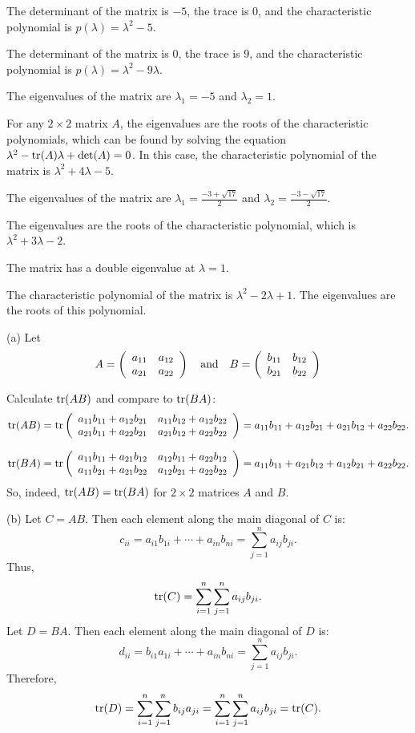 \documentclass{ximera}
\begin{document}
 The determinant of the matrix is $-5$, the trace is $0$, and
the characteristic polynomial is $p(\lambda)=\lambda^2-5$.

 The determinant of the matrix is $0$, the trace is $9$, and
the characteristic polynomial is $p(\lambda)=\lambda^2-9\lambda$.

 \ans The eigenvalues of the matrix are $\lambda_1 = -5$ and
$\lambda_2 = 1$.

\soln For any $2 \times 2$ matrix $A$, the eigenvalues are the roots
of the characteristic polynomials, which can be found by solving the
equation $\lambda^2 - {\rm tr}(A)\lambda + \det(A) = 0$.  In this case, the
characteristic polynomial of the matrix is $\lambda^2 + 4\lambda - 5$.

 \ans The eigenvalues of the matrix are
$\lambda_1 = \frac{-3 + \sqrt{17}}{2}$ and $\lambda_2 =
\frac{-3 - \sqrt{17}}{2}$.

\soln The eigenvalues are the roots of the characteristic polynomial, which
is $\lambda^2 + 3\lambda - 2$.

 \ans The matrix has a double eigenvalue at $\lambda = 1$.

\soln The characteristic polynomial of the matrix is $\lambda^2 - 2\lambda
+ 1$.  The eigenvalues are the roots of this polynomial.

(a) Let
\[
A = \left(\begin{array}{rr} a_{11} & a_{12}\\ a_{21} &a_{22}\end{array}\right) \quad\mbox{and}\quad
B = \left(\begin{array}{rr} b_{11} & b_{12}\\ b_{21} &b_{22}\end{array}\right)
\]

Calculate ${\rm tr}(AB)$ and compare to ${\rm tr}(BA)$:
\[
{\rm tr}(AB) =
{\rm tr}\left(\begin{array}{rr} a_{11}b_{11} + a_{12}b_{21} & a_{11}b_{12} + a_{12}b_{22}\\ a_{21}b_{11} + a_{22}b_{21} &a_{21}b_{12} + a_{22}b_{22}\end{array}\right) =
a_{11}b_{11} + a_{12}b_{21} + a_{21}b_{12} + a_{22}b_{22}.
\]

\[
{\rm tr}(BA) =
{\rm tr}\left(\begin{array}{rr} a_{11}b_{11} + a_{21}b_{12} & a_{12}b_{11} + a_{22}b_{12}\\ a_{11}b_{21} + a_{21}b_{22} &a_{12}b_{21} + a_{22}b_{22}\end{array}\right) =
a_{11}b_{11} + a_{21}b_{12} + a_{12}b_{21} + a_{22}b_{22}.
\]
So, indeed, ${\rm tr}(AB) = {\rm tr}(BA)$ for $2 \times 2$ matrices
$A$ and $B$.

(b) Let $C = AB$.  Then each element along the main diagonal of $C$ is:
\[
c_{ii} = a_{i1}b_{1i} + \cdots + a_{in}b_{ni} =
\sum_{j = 1}^{n} a_{ij}b_{ji}.
\]
Thus,
\[
{\rm tr}(C) = \sum_{i = 1}^{n} \sum_{j = 1}^{n} a_{ij}b_{ji}.
\]
Let $D = BA$.  Then each element along the main diagonal of $D$ is:
\[
d_{ii} = b_{i1}a_{1i} + \cdots + a_{in}b_{ni} =
\sum_{j = 1}^n a_{ij}b_{ji}.
\]
Therefore,
\[
{\rm tr}(D) = \sum_{i = 1}^{n} \sum_{j = 1}^{n} b_{ij}a_{ji}
= \sum_{i = 1}^{n} \sum_{j = 1}^{n} a_{ij}b_{ji} = {\rm tr}(C).
\]
\end{document}
